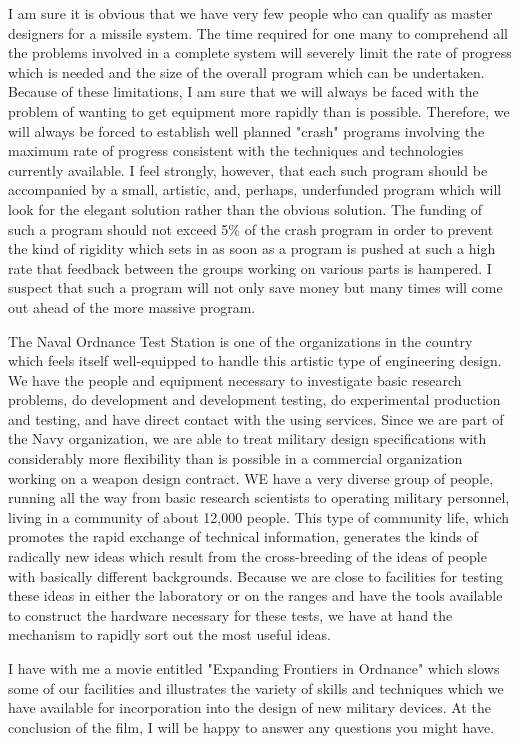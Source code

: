 \documentclass[twocolumn]{memoir}
\begin{document}
I am sure it is obvious that we have very few people who can qualify as master designers for a missile system. The time required for one many to comprehend all the problems involved in a complete system will severely limit the rate of progress which is needed and the size of the overall program which can be undertaken. Because of these limitations, I am sure that we will always be faced with the problem of wanting to get equipment more rapidly than is possible. Therefore, we will always be forced to establish well planned "crash" programs involving the maximum rate of progress consistent with the techniques and technologies currently available. I feel strongly, however, that each such program should be accompanied by a small, artistic, and, perhaps, underfunded program which will look for the elegant solution rather than the obvious solution. The funding of such a program should not exceed 5\% of the crash program in order to prevent the kind of rigidity which sets in as soon as a program is pushed at such a high rate that feedback between the groups working on various parts is hampered. I suspect that such a program will not only save money but many times will come out ahead of the more massive program.

The Naval Ordnance Test Station is one of the organizations in the country which feels itself well-equipped to handle this artistic type of engineering design. We have the people and equipment necessary to investigate basic research problems, do development and development testing, do experimental production and testing, and have direct contact with the using services. Since we are part of the Navy organization, we are able to treat military design specifications with considerably more flexibility than is possible in a commercial organization working on a weapon design contract. WE have a very diverse group of people, running all the way from basic research scientists to operating military personnel, living in a community of about 12,000 people. This type of community life, which promotes the rapid exchange of technical information, generates the kinds of radically new ideas which result from the cross-breeding of the ideas of people with basically different backgrounds. Because we are close to facilities for testing these ideas in either the laboratory or on the ranges and have the tools available to construct the hardware necessary for these tests, we have at hand the mechanism to rapidly sort out the most useful ideas.

I have with me a movie entitled "Expanding Frontiers in Ordnance" which slows some of our facilities and illustrates the variety of skills and techniques which we have available for incorporation into the design of new military devices. At the conclusion of the film, I will be happy to answer any questions you might have.
\end{document}
